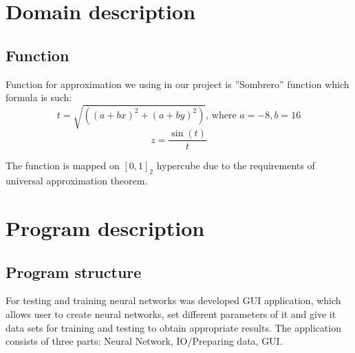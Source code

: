 \documentclass[a4paper,12pt]{article}
\begin{document}
\section{Domain description}

\subsection{Function}
Function for approximation we using in our project is ''Sombrero'' function which formula is such:
\begin{equation}
 t = \sqrt{((a+bx)^2+(a+by)^2)} \text{, where } a = -8, b = 16
 \end{equation}
 \begin{equation}
 z = \frac
 {\sin(t)}
 {t}
\end{equation}

The function is mapped on $[0,1]_2$ hypercube due to the requirements of universal approximation theorem.





\section{Program description}

\subsection{Program structure}

For testing and training neural networks was developed GUI application, which allows user to create neural networks, set different parameters of it and give it data sets for training and  testing to obtain appropriate results. The application consists of three parts: Neural Network, IO/Preparing data, GUI. 
\end{document}
